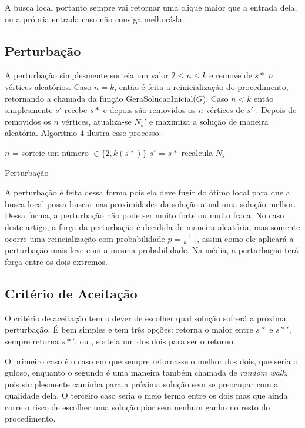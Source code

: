 \documentclass{article}
\begin{document}
A busca local portanto sempre vai retornar uma clique maior que a entrada dela, ou a própria entrada caso não consiga melhorá-la. 

\subsection{Perturbação}

A perturbação simplesmente sorteia um valor $2 \leq n \leq k$ e remove de $s*$ $n$ vértices aleatórios. Caso $n = k$, então é feita a reinicialização do procedimento, retornando a chamada da função GeraSolucaoInicial($G$). Caso $n < k$ então simplesmente $s'$ recebe $s*$ e depois são removidos os $n$ vértices de $s'$ . Depois de removidos os $n$ vértices, atualiza-se $N_s'$ e maximiza a solução de maneira aleatória. Algoritmo 4 ilustra esse processo.\par

\begin{algorithm}
 $n$ = sorteie um número $\in \{2,k(s*)\}$\;
 $s'$ = $s*$\;
 recalcula $N_{s'}$\;
 \caption{Perturbação}
\end{algorithm}


A perturbação é feita dessa forma pois ela deve fugir do ótimo local para que a busca local possa buscar nas proximidades da solução atual uma solução melhor. Dessa forma, a perturbação não pode ser muito forte ou muito fraca. No caso deste artigo, a força da perturbação é decidida de maneira aleatória, mas somente ocorre uma reincialização com probabilidade $p = \frac{1}{k-1}$, assim como ele aplicará a perturbação mais leve com a mesma probabilidade. Na média, a perturbação terá força entre os dois extremos.

\subsection{Critério de Aceitação}

O critério de aceitação tem o dever de escolher qual solução sofrerá a próxima perturbação. É bem simples e tem três opções: retorna o maior entre $s*$ e $s*'$, sempre retorna $s*'$, ou , sorteia um dos dois para ser o retorno. \par

O primeiro caso é o caso em que sempre retorna-se o melhor dos dois, que seria o guloso, enquanto o segundo é uma maneira também chamada de \textit{random walk}, pois simplesmente caminha para a próxima solução sem se preocupar com a qualidade dela. O terceiro caso seria o meio termo entre os dois mas que ainda corre o risco de escolher uma solução pior sem nenhum ganho no resto do procedimento.\par
\end{document}
